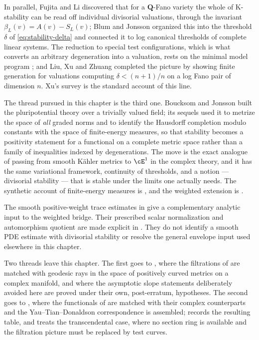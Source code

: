 In parallel, Fujita \cite{Fuj19} and Li \cite{Li17} discovered that for a
$\mathbf Q$-Fano variety the whole of K-stability can be read off
individual divisorial valuations, through the invariant
$\beta_L(v)=A(v)-S_L(v)$; Blum and Jonsson \cite{BJ20} organized this
into the threshold $\delta$ of \eqref{eq:stability-delta} and connected
it to log canonical thresholds of complete linear systems.  The reduction
to special test configurations, which is what converts an arbitrary
degeneration into a valuation, rests on the minimal model program
\cite{BCHM10}; and Liu, Xu and Zhuang \cite{LXZ22} completed the picture by
showing finite generation for valuations computing
$\delta<(n+1)/n$ on a log Fano pair of dimension $n$.  Xu's survey \cite{Xu21} is the standard account of
this line.

The thread pursued in this chapter is the third one.  Boucksom and Jonsson
\cite{BJ22} built the pluripotential theory over a trivially valued field;
its sequels \cite{BJKS1,BJKS2} used it to metrize the space of \emph{all}
graded norms and to identify the Hausdorff completion modulo constants
with the space of finite-energy measures, so that stability becomes a positivity statement for a
functional on a complete metric space rather than a family of inequalities
indexed by degenerations.  The move is the exact analogue of passing from
smooth K\"ahler metrics to $\cE^1$ in the complex theory, and it has the
same variational framework, continuity of thresholds, and a
notion --- divisorial stability --- that is stable under the limits one
actually needs.  The synthetic account of finite-energy measures is
\cite{BJ25FiniteEnergy}, and the weighted extension is
\cite{BJ25WeightedYTD}.

The smooth positive-weight trace estimates in
 give a complementary
analytic input to the weighted bridge. Their prescribed scalar
normalization and automorphism quotient are made explicit in
. They do not identify a
smooth PDE estimate with divisorial stability or
resolve the general envelope input used elsewhere in this chapter.

Two threads leave this chapter.  The first goes to
, where the filtrations of
 are matched with geodesic rays in the space of
positively curved metrics on a complex manifold, and where the asymptotic
slope statements deliberately avoided here are proved under their own,
post-erratum, hypotheses.  The second goes to
, where the functionals of
 are matched with their complex
counterparts and the Yau--Tian--Donaldson correspondence is assembled;
 records the resulting table, and
 treats the transcendental case, where no
section ring is available and the filtration picture must be replaced by
test curves.

\endgroup
